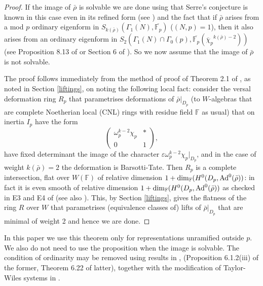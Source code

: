 \documentclass[12pt]{amsart}
\newcommand{\aFp}{\overline{\mathbb{F}_{p}}}
\newcommand{\rhobar}{\overline{\rho}}
\def\rhobar{ {\bar {\rho} } }
\def\rhob{ {\bar {\rho} } }
\newcommand{\F}{{\mathbb F}}
\newcommand{\vep}{{\varepsilon}}
\begin{document}
\begin{proof} If the image of $\rhob$ is solvable we are done using 
that Serre's conjecture is known in this case even in its refined form (see \cite{Ribet}) and the fact that if $\rhobar$ arises from a mod $p$ ordinary 
eigenform in $S_{k(\rhobar)}(\Gamma_1(N),\aFp)$  ($(N,p)=1$), then it also arises from an ordinary eigenform in
$S_2(\Gamma_1(N) \cap \Gamma_0(p),\aFp({\overline \chi_p}^{k(\rhobar)-2}))$ (see Proposition 8.13 of \cite{Gross} or
Section 6 of \cite{Edix}). So we
now assume that the image of $\rhob$ is not solvable.
  
The proof follows immediately from the method of proof of Theorem 2.1 of
\cite{KW}, as noted in Section \ref{liftings}, on noting the
following local fact: consider the versal deformation ring $R_p$
  that parametrises deformations of $\rhob|_{D_p}$
(to $W$-algebras that are complete Noetherian local (CNL)
rings with residue field $\F$ as usual)
that on inertia $I_p$ have the form $$\left( \begin{array}{cc}
    \omega_p^{k-2}\chi_p  & *  \\
    0 & 1
\end{array} \right),$$ have fixed determinant the image of the character 
$\vep\omega_p^{k-2}\chi_p|_{D_p}$, and in the case of weight $k(\rhobar)=2$ the deformation is Barsotti-Tate. Then $R_p$ is a complete intersection, flat over $W(\F)$
of relative dimension $1+{\rm dim}_{\F}(H^0(D_p,{\rm Ad}^0(\rhobar))$: 
in fact it is even smooth 
of relative dimension $1+{\rm dim}_{\F}(H^0(D_p,{\rm Ad}^0(\rhobar))$ as checked
  in E3 and  E4 of \cite{Tay3} (see also \cite{[R02]}).  This, by Section \ref{liftings}, gives the flatness of the ring $R$ over $W$ that parametrises (equivalence classes of) 
lifts of $\rhob|_{D_p}$ that are minimal of weight 2 and hence we are done.
\end{proof}

 In this paper we use this theorem only for representations unramified outside $p$. We also do not need to use the proposition when the image is solvable. The condition of ordinarity may be removed using
results in \cite{BM}, \cite{Savitt1} (Proposition 6.1.2(iii) of the former, 
Theorem 6.22 of latter), together with the modification of Taylor-Wiles systems
in \cite{Kisin}.
\end{document}
